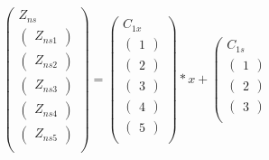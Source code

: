 \documentclass[10pt]{article}
\begin{document}
\[\left(\begin{array}{c}
  Z_{ns}\\
  \hline
  \left(\begin{array}{c} Z_{ns1} \end{array}\right)\\
  \left(\begin{array}{c} Z_{ns2} \end{array}\right)\\
  \left(\begin{array}{c} Z_{ns3} \end{array}\right)\\
  \left(\begin{array}{c} Z_{ns4} \end{array}\right)\\
  \left(\begin{array}{c} Z_{ns5} \end{array}\right)\\
\end{array}\right) =
\left(\begin{array}{c}
  C_{1x}\\
  \hline
  \left(\begin{array}{c}1\end{array}\right)\\
  \left(\begin{array}{c}2\end{array}\right)\\
  \left(\begin{array}{c}3\end{array}\right)\\
  \left(\begin{array}{c}4\end{array}\right)\\
  \left(\begin{array}{c}5\end{array}\right)\\
\end{array}\right)*x +
\left(\begin{array}{c}
  C_{1s}\\
  \hline
  \left(\begin{array}{c}1\end{array}\right)\\
  \left(\begin{array}{c}2\end{array}\right)\\
  \left(\begin{array}{c}3\end{array}\right)\\

\end{array}\]
\end{document}

